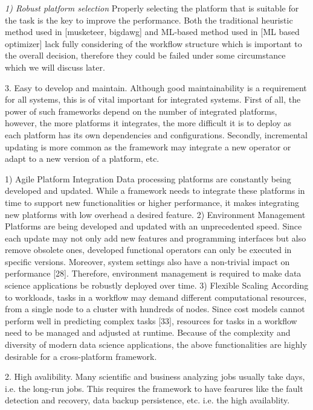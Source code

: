 \textit{1) Robust platform selection} Properly selecting the platform that is suitable for the task is the key to improve the performance. Both the traditional heuristic method used in [musketeer, bigdawg] and ML-based method used in [ML based optimizer] lack fully considering of the workflow structure which is important to the overall decision, therefore they could be failed under some circumstance which we will discuss later.

3. Easy to develop and maintain. Although good maintainability is a requirement for all systems, this is of vital important for integrated systems. First of all, the power of such frameworks depend on the number of integrated platforms, however, the more platforms it integrates, the more difficult it is to deploy as each platform has its own dependencies and configurations. Secondly, incremental updating is more common as the framework may integrate a new operator or adapt to a new version of a platform, etc.

1) Agile Platform Integration Data processing
platforms are constantly being developed and updated. While a
framework needs to integrate these platforms in time to support
new functionalities or higher performance, it makes integrating
new platforms with low overhead a desired feature. 2) Environment
Management Platforms are being developed and updated with an
unprecedented speed. Since each update may not only add new
features and programming interfaces but also remove obsolete ones,
developed functional operators can only be executed in specific versions. Moreover, system settings also have a non-trivial impact on
performance [28]. Therefore, environment management is required
to make data science applications be robustly deployed over time.
3) Flexible Scaling According to workloads, tasks in a workflow may
demand different computational resources, from a single node to
a cluster with hundreds of nodes. Since cost models cannot perform well in predicting complex tasks [33], resources for tasks in a
workflow need to be managed and adjusted at runtime. Because of
the complexity and diversity of modern data science applications,
the above functionalities are highly desirable for a cross-platform
framework.



2. High avalibility. Many scientific and business analyzing jobs usually take days, i.e. the long-run jobs. This requires the framework to have fearures like the fault detection and recovery, data backup persistence, etc. i.e. the high availablity. 



